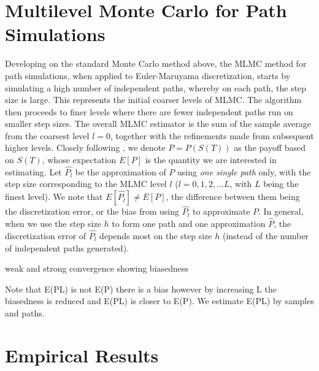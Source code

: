 \documentclass{article}
\begin{document}
\section{Multilevel Monte Carlo for Path Simulations}
	Developing on the standard Monte Carlo method above, the MLMC method for path simulations, when applied to Euler-Maruyama discretization, starts by simulating a high number of independent paths, whereby on each path, the step size is large. This represents the initial coarser levels of MLMC. The algorithm then proceeds to finer levels where there are fewer independent paths run on smaller step sizes. The overall MLMC estimator is the sum of the sample average from the coarsest level $l=0$, together with the refinements made from subsequent higher levels.
	Closely following \cite{giles08}, we denote $P=P(S(T))$ as the payoff based on $S(T)$, whose expectation $E[P]$ is the quantity we are interested in estimating. Let $\widehat{P_l}$ be the approximation of $P$ using \textit{one single path} only, with the step size corresponding to the MLMC level $l$ ($l=0,1,2,...L$, with $L$ being the finest level). We note that $E[\widehat{P_l}] \neq E[P]$, the difference between them being the discretization error, or the bias from using $\widehat{P_l}$ to approximate $P$. In general, when we use the step size $h$ to form one path and one approximation $\widehat{P}$, the discretization error of $\widehat{P_l}$ depends most on the step size $h$ (instead of the number of independent paths generated). 
	
	weak and strong convergence showing biasedness
	
	Note that E(PL) is not E(P) there is a bias however by increasing L the biasedness is reduced and E(PL) is closer to E(P). We estimate E(PL) by samples and paths.
	
\section{Empirical Results}



\end{document}
